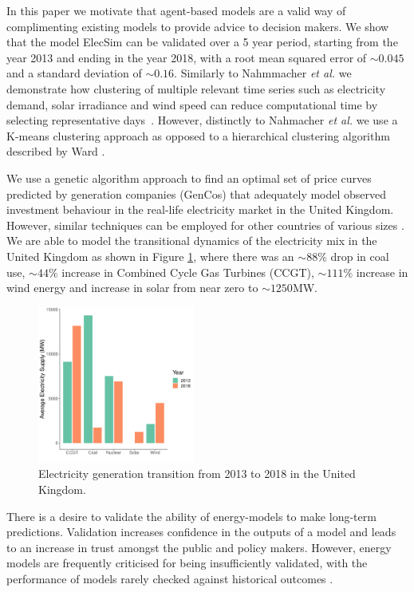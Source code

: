 \documentclass[final,3p,times,twocolumn,numbers]{elsarticle}
\begin{document}
In this paper we motivate that agent-based models are a valid way of complimenting existing models to provide advice to decision makers. We show that the model ElecSim \cite{Kell} can be validated over a 5 year period, starting from the year 2013 and ending in the year 2018, with a root mean squared error of {\color{red} $\sim0.045$} and a standard deviation of {\color{red}$\sim0.16$}. Similarly to Nahmmacher \textit{et al.} we demonstrate how clustering of multiple relevant time series such as electricity demand, solar irradiance and wind speed can reduce computational time by selecting representative days~\cite{Nahmmacher2016}. However, distinctly to Nahmacher \textit{et al.} we use a K-means clustering approach \cite{forgy65} as opposed to a hierarchical clustering algorithm described by Ward \cite{doi:10.1080/01621459.1963.10500845}.

We use a genetic algorithm approach to find an optimal set of price curves predicted by generation companies (GenCos) that  adequately model observed investment behaviour in the real-life electricity market in the United Kingdom. However, similar techniques can be employed for other countries of various sizes \cite{Kell}. We are able to model the transitional dynamics of the electricity mix in the United Kingdom as shown in Figure \ref{fig:uk_historical_mix}, where there was an $\sim88\%$ drop in coal use, $\sim44\%$ increase in Combined Cycle Gas Turbines (CCGT), $\sim111\% $ increase in wind energy and increase in solar from near zero to $\sim 1250$MW.


\begin{figure}
\centering
\includegraphics[width=0.46\textwidth]{figures/introduction/uk_historical_mix.pdf}
\caption{Electricity generation transition from 2013 to 2018 in the United Kingdom.}
\label{fig:uk_historical_mix}
\end{figure}

There is a desire to validate the ability of energy-models to make long-term predictions. Validation increases confidence in the outputs of a model and leads to an increase in trust amongst the public and policy makers. However, energy models are frequently criticised for being insufficiently validated, with the performance of models rarely checked against historical outcomes \cite{Beckman2011}.
\end{document}
